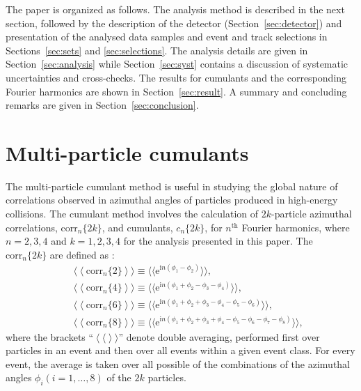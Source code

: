 \documentclass[cernpreprint,texlive=2014,txfonts,UKenglish]{latex/atlasdoc}
\begin{document}
The paper is organized as follows. The analysis method is described in the next section, followed by the description of the detector (Section~\ref{sec:detector}) and presentation of the analysed data samples and event and track selections in Sections~\ref{sec:sets} and \ref{sec:selections}. The analysis details are given in Section~\ref{sec:analysis} while Section~\ref{sec:syst} contains a discussion of systematic uncertainties and cross-checks. The results for cumulants and the corresponding Fourier harmonics are shown in Section~\ref{sec:result}. A summary and concluding remarks are given in Section~\ref{sec:conclusion}. 

\section{Multi-particle cumulants}
\label{sec:method}
The multi-particle cumulant method is useful in studying the global nature of correlations observed in azimuthal angles of particles produced in high-energy collisions. 
The cumulant method involves the calculation of $2k$-particle azimuthal correlations, $\mathrm{corr}_n\{2k\}$,  and cumulants, $c_n\{2k\}$, for $n^{\mathrm{th}}$ Fourier harmonics, where $n= 2, 3, 4$  and $k= 1, 2, 3, 4$ for the analysis presented in this paper. The $\mathrm{corr}_n\{2k\}$ are defined as \cite{Borghini:2000,Snellings}: 
\begin{eqnarray}
  &&   \langle \left\langle \mathrm{corr}_n\{2\}\right\rangle\rangle \equiv \langle \langle \mathrm{e}^{\mathrm{i}n(\phi_1-\phi_2)} \rangle\rangle,  \nonumber \\
  &&   \langle\left\langle \mathrm{corr}_n\{4\}\right\rangle\rangle \equiv \langle\langle \mathrm{e}^{\mathrm{i}n(\phi_1 +\phi_2-\phi_3-\phi_4)} \rangle\rangle, \nonumber \\
  &&   \langle\left\langle \mathrm{corr}_n\{6\}\right\rangle\rangle \equiv \langle\langle \mathrm{e}^{\mathrm{i}n(\phi_1 +\phi_2+\phi_3-\phi_4 -\phi_5-\phi_6)} \rangle\rangle, \nonumber \\
  &&   \langle\left\langle \mathrm{corr}_n\{8\}\right\rangle\rangle \equiv \langle\langle \mathrm{e}^{\mathrm{i}n(\phi_1 +\phi_2+\phi_3+\phi_4 -\phi_5-\phi_6-\phi_7-\phi_8)} \rangle\rangle, \nonumber 
\end{eqnarray}
\noindent
where the brackets ``$\left\langle \langle \right\rangle \rangle$'' denote double averaging, performed first over particles in an event and then over all events within a given event class.  For every event, the average is taken over all possible of the combinations of the azimuthal angles $\phi_{i} ( i= 1,\ldots,8)$ of the  $2k$ particles. 
\end{document}
